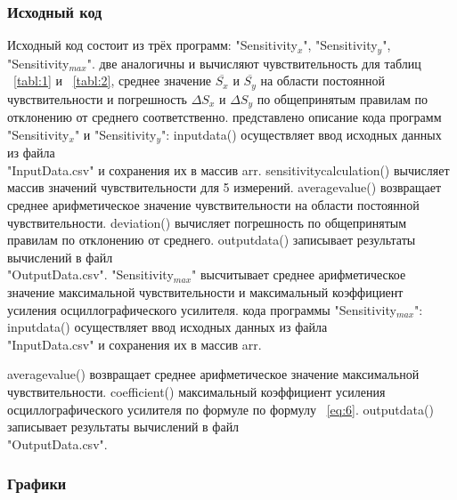 \subsubsection{Исходный код}
Исходный код состоит из трёх программ: "Sensitivity$_x$", "Sensitivity$_y$", \\"Sensitivity$_{max}$".  две аналогичны и вычисляют чувствительность для таблиц ~\ref{tabl:1} и ~\ref{tabl:2}, среднее значение $\overline{S_x}$ и $\overline{S_y}$ на области постоянной чувствительности и погрешность $\Delta S_x$ и $\Delta S_y$ по общепринятым правилам по отклонению от среднего соответственно.
\vspace{3mm}
 представлено описание кода программ "Sensitivity$_x$" и "Sensitivity$_y$":
 inputdata() осуществляет ввод исходных данных из файла \\"InputData.csv"
и сохранения их в массив arr.
 sensitivity\underline{}calculation() вычисляет массив значений чувствительности для 5 измерений.
 average\underline{}value() возвращает среднее арифметическое значение чувствительности на области постоянной чувствительности.
 deviation() вычисляет погрешность по общепринятым правилам по отклонению от среднего.
 outputdata() записывает результаты вычислений в файл \\"OutputData.csv".
\vspace{3mm}
 "Sensitivity$_{max}$" высчитывает среднее арифметическое значение максимальной чувствительности и максимальный коэффициент усиления осциллографического усилителя.
 кода программы "Sensitivity$_{max}$":
 inputdata() осуществляет ввод исходных данных из файла \\"InputData.csv"
и сохранения их в массив arr.

 average\underline{}value() возвращает среднее арифметическое значение максимальной чувствительности.
 coefficient() максимальный коэффициент усиления осциллографического усилителя по формуле по формулу ~\ref{eq:6}.
 outputdata() записывает результаты вычислений в файл \\"OutputData.csv".
\vspace{3mm}


\subsubsection{Графики}




